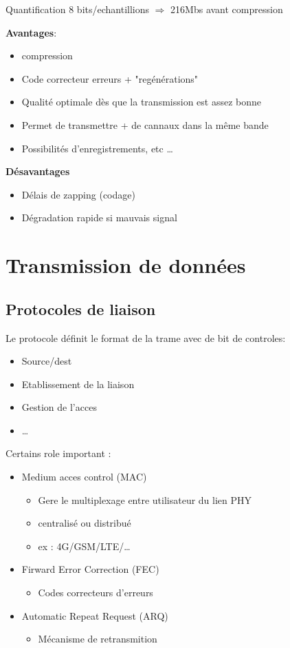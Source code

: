 \documentclass[12pt]{article}
\begin{document}
			Quantification 8 bits/echantillions $\Rightarrow$ 216Mbs avant compression
			
			\textbf{Avantages}:
			\begin{itemize}
				\item compression
				\item Code correcteur erreurs + "regénérations"
				\item Qualité optimale dès que la transmission est assez bonne
				\item Permet de transmettre + de cannaux dans la même bande
				\item Possibilités d’enregistrements, etc \dots 
			\end{itemize}
			
			\textbf{Désavantages}
			\begin{itemize}
				\item Délais de zapping (codage)
				\item Dégradation rapide si mauvais signal
			\end{itemize}
			
\section{Transmission de données}
\label{TDD}
	\subsection{Protocoles de liaison}
		Le protocole définit le format de la trame avec de bit de controles:
		\begin{itemize}
			\item Source/dest
			\item Etablissement de la liaison
			\item Gestion de l'acces
			\item \dots
		\end{itemize}
		
		Certains role important :
		\begin{itemize}
			\item Medium acces control (MAC)
			\begin{itemize}
				\item Gere le multiplexage entre utilisateur du lien PHY
				\item centralisé ou distribué
				\item ex : 4G/GSM/LTE/\dots
			\end{itemize}
			\item Firward Error Correction (FEC)
			\begin{itemize}
				\item Codes correcteurs d'erreurs
			\end{itemize}
			\item Automatic Repeat Request  (ARQ)
			\begin{itemize}
				\item Mécanisme de retransmition 
			\end{itemize}
		\end{itemize}
		
\end{document}

